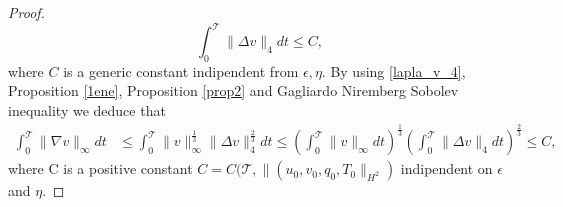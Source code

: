 \documentclass[11pt, a4paper, article,reqno,]{amsart}
\theoremstyle{remark}
\numberwithin{equation}{section}
\begin{document}
\begin{proof}
\begin{equation}\label{lapla_v_4}
    \int_0^\mathcal{T}\|\Delta v\|_4 dt \leq C,
\end{equation}
where $C$ is a generic constant indipendent from $\epsilon,\eta$. By using \eqref{lapla_v_4}, Proposition \ref{1ene}, Proposition \ref{prop2} and Gagliardo Niremberg Sobolev inequality we deduce that
\begin{equation}\label{grad_v_infty}
    \begin{aligned}
        \int_0^\mathcal{T}\|\nabla v\|_\infty dt & \leq \int_0^\mathcal{T} \|v\|_\infty^{\frac{1}{3}}\|\Delta v\|_4^{\frac{2}{3}}dt \leq \left(\int_0^\mathcal{T} \|v\|_\infty dt \right)^{\frac{1}{3}} \left( \int_0^\mathcal{T} \|\Delta v\|_4dt \right)^{\frac{2}{3}}\!\!\leq  C,
    \end{aligned}
\end{equation}
where C is a positive constant $C= C(\mathcal{T},\|(u_0,v_0,q_0,T_{0}\|_{H^2})$ indipendent on $\epsilon$ and $\eta$. 


\end{proof}
\end{document}
